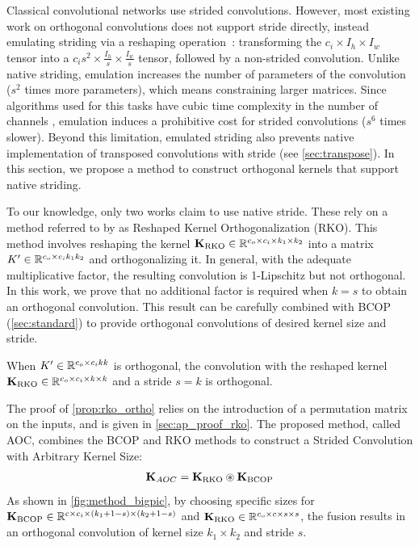      Classical convolutional networks use strided convolutions. However, most existing work on orthogonal convolutions does not support stride directly, instead emulating striding via a reshaping operation~\cite{shi2016real}: transforming the $c_i \times I_h \times I_w$ tensor into a $c_i s^2 \times \frac{I_h}{s} \times \frac{I_w}{s}$ tensor, followed by a non-strided convolution. Unlike native striding, emulation increases the number of parameters of the convolution ($s^2$ times more parameters), which means constraining larger matrices. Since algorithms used for this tasks have cubic time complexity in the number of channels \cite{prach_1-lipschitz_2023}, emulation induces a prohibitive cost for strided convolutions ($s^6$ times slower). Beyond this limitation, emulated striding also prevents native implementation of transposed convolutions with stride (see \cref{sec:transpose}). In this section, we propose a method to construct orthogonal kernels that support native striding.

    To our knowledge, only two works \cite{serrurier_achieving_2021,serrurier_explainable_nodate} claim to use native stride. These rely on a method referred to by \cite{li_preventing_2019} as Reshaped Kernel Orthogonalization (RKO). This method involves reshaping the kernel $\mathbf{K}_{\text{RKO}} \in \mathbb{R}^{c_o \times c_i \times k_1 \times k_2}$ into a matrix $K' \in \mathbb{R}^{c_o \times c_i k_1 k_2}$ and orthogonalizing it. In general, with the adequate multiplicative factor, the resulting convolution is 1-Lipschitz but not orthogonal. 
    In this work, we prove that no additional factor is required when $k=s$ to obtain an orthogonal convolution. This result can be carefully combined with BCOP (\cref{sec:standard}) to provide orthogonal convolutions of desired kernel size and stride.
    \begin{proposition}[RKO gives an orthogonal kernel\label{prop:rko_ortho} when $k_1 = k_2 = s$]
        When $K' \in \mathbb{R}^{c_o \times c_i k k}$ is orthogonal, the convolution with the reshaped kernel $\mathbf{K}_{\text{RKO}} \in \mathbb{R}^{c_o \times c_i \times k \times k}$ and a stride $s=k$ is orthogonal.
    \end{proposition}

    The proof of \cref{prop:rko_ortho} relies on the introduction of a permutation matrix on the inputs, and is given in \cref{sec:ap_proof_rko}.
    The proposed method, called AOC, combines the BCOP and RKO methods to construct a Strided Convolution with Arbitrary Kernel Size:
    \begin{align}
        \mathbf{K}_{AOC}= \mathbf{K}_{\text{RKO}} \circledast \mathbf{K}_{\text{BCOP}} \label{def:AOC_kernel}
    \end{align}
    As shown in \cref{fig:method_bigpic}, by choosing specific sizes for $\mathbf{K}_{\text{BCOP}} \in \mathbb{R}^{c \times c_i \times (k_1+1-s) \times (k_2+1-s)}$ and $\mathbf{K}_{\text{RKO}} \in \mathbb{R}^{c_o \times c \times s \times s}$, the fusion results in an orthogonal convolution of kernel size $k_1 \times k_2$ and stride $s$. 
    
